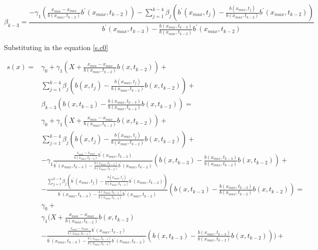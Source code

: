 \documentclass{article}
\begin{document}
$$ \beta_{k-3} =     \frac{-\gamma_1 \left(\frac{x_{min}-x_{max}}{ b(x_{max}, t_{k-2}) }   b^{\prime}(x_{max}, t_{k-2}) \right) -
\sum_{j=1}^{k-4}\beta_j \left(b^{\prime}(x_{max}, t_j) -  \frac{b(x_{max}, t_j)}{ b(x_{max}, t_{k-2})} b^{\prime}(x_{max}, t_{k-2})\right)}{b^{\prime}(x_{max}, t_{k-3}) -  \frac{b(x_{max}, t_{k-3})}{ b(x_{max}, t_{k-2})} b^{\prime}(x_{max}, t_{k-2})}$$ 


Substituting in the equation \ref{s.c0} 

\begin{equation}
\begin{aligned}
s(x)= & \gamma_0+\gamma_1 \left(X +  \frac{x_{min}-x_{max}}{ b(x_{max}, t_{k-2}) } b(x, t_{k-2}) \right) +  \\
& \sum_{j=1}^{k-4}\beta_j \left(b(x, t_j) -  \frac{b(x_{max}, t_j)}{ b(x_{max}, t_{k-2})} b(x, t_{k-2})\right)+\\
& \beta_{k-3} \left(b(x, t_{k-3}) -  \frac{b(x_{max}, t_{k-3})}{ b(x_{max}, t_{k-2})} b(x, t_{k-2})\right)=\\
& \gamma_0+\gamma_1 \left(X +  \frac{x_{min}-x_{max}}{ b(x_{max}, t_{k-2}) } b(x, t_{k-2}) \right) +  \\
& \sum_{j=1}^{k-4}\beta_j \left(b(x, t_j) -  \frac{b(x_{max}, t_j)}{ b(x_{max}, t_{k-2})} b(x, t_{k-2})\right)+\\
& - \gamma_1 \frac{ \frac{x_{min}-x_{max}}{ b(x_{max}, t_{k-2}) }   b^{\prime}(x_{max}, t_{k-2}) }{b^{\prime}(x_{max}, t_{k-3}) -  \frac{b(x_{max}, t_{k-3})}{ b(x_{max}, t_{k-2})} b^{\prime}(x_{max}, t_{k-2})} \left(b(x, t_{k-3}) -  \frac{b(x_{max}, t_{k-3})}{ b(x_{max}, t_{k-2})} b(x, t_{k-2})\right)+\\
& - \frac{\sum_{j=1}^{k-4}\beta_j \left(b^{\prime}(x_{max}, t_j) -  \frac{b(x_{max}, t_j)}{ b(x_{max}, t_{k-2})} b^{\prime}(x_{max}, t_{k-2})\right)}{b^{\prime}(x_{max}, t_{k-3}) -  \frac{b(x_{max}, t_{k-3})}{ b(x_{max}, t_{k-2})} b^{\prime}(x_{max}, t_{k-2})} \left(b(x, t_{k-3}) -  \frac{b(x_{max}, t_{k-3})}{ b(x_{max}, t_{k-2})} b(x, t_{k-2})\right)=\\
& \gamma_0+\\
&\gamma_1 \Biggl( X +  \frac{x_{min}-x_{max}}{ b(x_{max}, t_{k-2}) } b(x, t_{k-2})  \\  
&  - \frac{ \frac{x_{min}-x_{max}}{ b(x_{max}, t_{k-2}) }   b^{\prime}(x_{max}, t_{k-2}) }{b^{\prime}(x_{max}, t_{k-3}) -  \frac{b(x_{max}, t_{k-3})}{ b(x_{max}, t_{k-2})} b^{\prime}(x_{max}, t_{k-2})} \left(b(x, t_{k-3}) -  \frac{b(x_{max}, t_{k-3})}{ b(x_{max}, t_{k-2})} b(x, t_{k-2})\right)   \Biggr) +  \\

\end{aligned}
\end{equation}
\end{document}
